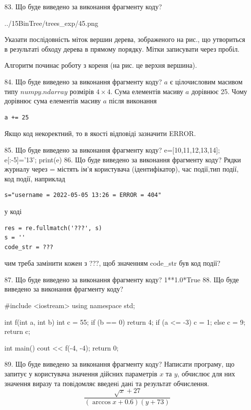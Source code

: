 \documentclass[11pt]{article}
\begin{document}
83. Що буде виведено за виконання фрагменту коду?

\begin{center}
	{../15BinTree/trees_exp/45.png}
\end{center}
Указати послідовність міток вершин дерева, зображеного на рис., що утвориться в результаті обходу дерева в прямому порядку. Мітки записувати через пробіл.\par Алгоритм починає роботу з кореня (на рис. це верхня вершина).

84. Що буде виведено за виконання фрагменту коду?
$a$ є цілочисловим масивом типу $numpy.ndarray$ розмірів $4{\times}4$. Сума елементів масиву $a$ дорівнює 25. Чому дорівнює сума елементів масиву $a$ після виконання 
\begin{verbatim}
a += 25
\end{verbatim}


Якщо код некоректний, то в якості відповіді зазначити ERROR.



85. Що буде виведено за виконання фрагменту коду?
e=[10,11,12,13,14]; e[:-5]='13'; print(e)
86. Що буде виведено за виконання фрагменту коду?
Рядки журналу через = містять ім'я користувача (ідентифікатор), час події,тип події, код події, наприклад
\begin{verbatim}
s="username = 2022-05-05 13:26 = ERROR = 404"
\end{verbatim}
у коді 
\begin{verbatim}
res = re.fullmatch('???', s) 
s = ''
code_str = ??? 
\end{verbatim}
чим треба замінити кожен з ???, щоб значенням code\_str був код події? 



87. Що буде виведено за виконання фрагменту коду?
1**1.0*True
88. Що буде виведено за виконання фрагменту коду?

#include <iostream>
using namespace std;

int f(int a, int b){
    int c = 55;
    if (b == 0)
        return 4;
    if (a <= -3)
         c = 1;
    else 
        c = 9;
    return c;
}

int main(){
    cout << f(-4, -4);
    return 0;
}

89. Що буде виведено за виконання фрагменту коду?
Написати програму, що запитує у користувача значення дійсних параметрів $x$ та $y$, обчислює для них значення виразу та повiдомляє введенi данi та результат обчислення.
$$\frac{\sqrt x + 27}{(\arccos x + 0.6) (y + 73)}$$ 
\end{document}
